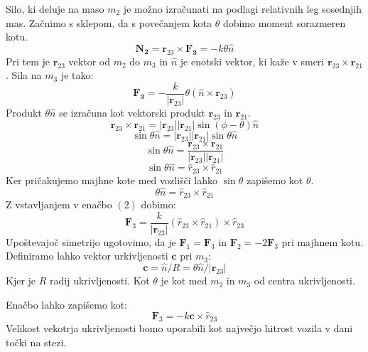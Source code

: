 \documentclass[10pt,a4paper]{article}
\begin{document}
Silo, ki deluje na maso $m_2$ je možno izračunati na podlagi relativnih leg sosednjih mas. Začnimo s sklepom, da s povečanjem kota $\theta$ dobimo moment sorazmeren kotu.
\begin{equation}
\mathbf{N_2} = \mathbf{r}_{23} \times \mathbf{F_3} = -k \theta \hat{n}
\end{equation}
Pri tem je $\mathbf{r}_{23}$ vektor od $m_2$ do $m_3$ in $\hat{n}$ je enotski vektor, ki kaže v smeri $\mathbf{r}_{23} \times \mathbf{r}_{21}$. Sila na $m_3$ je tako:
\begin{equation}
\mathbf{F_3} = -\frac{k}{|\mathbf{r}_{23}|}\theta(\hat{n} \times \mathbf{r}_{23})
\end{equation}
Produkt $\theta \hat{n}$ se izračuna kot vektorski produkt $\mathbf{r}_{23}$ in $\mathbf{r}_{21}$.
\begin{equation}
\mathbf{r}_{23} \times \mathbf{r}_{21} = |\mathbf{r}_{23}||\mathbf{r}_{21}| \sin(\phi - \theta) \hat{n}
\end{equation}
\begin{equation}
\sin\theta\hat{n} = |\mathbf{r}_{23}||\mathbf{r}_{21}|\sin\theta\hat{n}
\end{equation}
\begin{equation}
\sin\theta\hat{n} = \frac{\mathbf{r}_{23} \times \mathbf{r}_{21}}{|\mathbf{r}_{23}||\mathbf{r}_{21}|}
\end{equation}
\begin{equation}
\sin\theta\hat{n} = \hat{r}_{23} \times \hat{r}_{21}
\end{equation}
Ker pričakujemo majhne kote med vozlišči lahko $\sin\theta$ zapišemo kot $\theta$.
\begin{equation}
\theta\hat{n} = \hat{r}_{23} \times \hat{r}_{21}
\end{equation}
Z vstavljanjem v enačbo $(2)$ dobimo:
\begin{equation}
\mathbf{F}_3 = \frac{k}{|\mathbf{r}_{23}|}(\hat{r}_{23} \times \hat{r}_{21}) \times \hat{r}_{23}
\end{equation}
Upoštevajoč simetrijo ugotovimo, da je $\mathbf{F}_1 = \mathbf{F}_3$ in $\mathbf{F}_2 = -2\mathbf{F}_3$ pri majhnem kotu. Definiramo lahko vektor urkivljenosti $\mathbf{c}$ pri $m_3$:
\begin{equation}
\mathbf{c} = \hat{n}/R = \theta \hat{n} / |\mathbf{r}_{23}|
\end{equation}
Kjer je $R$ radij ukrivljenosti. Kot $\theta$ je kot med $m_2$ in $m_3$ od centra ukrivljenosti.

Enačbo lahko zapišemo kot:
\begin{equation}
\mathbf{F}_3 = -k \mathbf{c} \times \hat{r}_{23}
\end{equation}
Velikost vekotrja ukrivljenosti bomo uporabili kot največjo hitrost vozila v dani točki na stezi.
\end{document}
